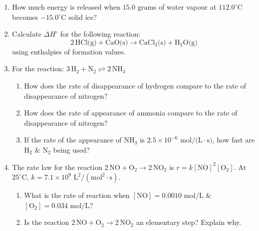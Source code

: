 \documentclass[12pt]{article}
\begin{document}
\begin{enumerate}[label=\arabic*.]
    \item How much energy is released when $15.0\text{ grams}$ of water vapour at $112.0^\circ\text{C}$ becomes $-15.0^\circ\text{C}$ solid ice?
    \vspace{4.5cm}

    \item Calculate $\Delta H^\circ$ for the following reaction: 
    \[
    2\,\text{HCl(g)} + \text{CaO(s)} \rightarrow \text{CaCl}_2\text{(s)} + \text{H}_2\text{O(g)}
    \]
    using enthalpies of formation values.
    \vspace{4.5cm}

    \item For the reaction: $3\,\text{H}_2 + \text{N}_2 \rightleftharpoons 2\,\text{NH}_3$
    \begin{enumerate}[label=\alph*)]
        \item How does the rate of disappearance of hydrogen compare to the rate of disappearance of nitrogen?
        \vspace{2cm}
        \item How does the rate of appearance of ammonia compare to the rate of disappearance of nitrogen?
        \vspace{2cm}
        \item If the rate of the appearance of $\text{NH}_3$ is $2.5 \times 10^{-6}\text{ mol/(L}\cdot\text{s)}$, how fast are $\text{H}_2$ \& $\text{N}_2$ being used?
        \vspace{3cm}
    \end{enumerate}

    \item The rate law for the reaction $2\,\text{NO} + \text{O}_2 \rightarrow 2\,\text{NO}_2$ is $r = k[\text{NO}]^2[\text{O}_2]$. At $25^\circ\text{C}$, $k = 7.1 \times 10^9\text{ L}^2/(\text{mol}^2\cdot\text{s})$.
    \begin{enumerate}[label=\alph*)]
        \item What is the rate of reaction when $[\text{NO}] = 0.0010\text{ mol/L}$ \& $[\text{O}_2] = 0.034\text{ mol/L}$?
        \vspace{2.5cm}
        \item Is the reaction $2\,\text{NO} + \text{O}_2 \rightarrow 2\,\text{NO}_2$ an elementary step? Explain why.
        \vspace{2.5cm}
    \end{enumerate}


\end{enumerate}
\end{document}
